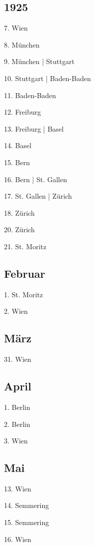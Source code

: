 \documentclass[twoside=false,titlepage=false,open=any, parskip=never, fontsize=10pt, headings=small, chapterprefix=false, appendixprefix=false, DIV=15]{scrbook}
\begin{document}
\begin{multicols}{3}
            \chapter*{1925}
            7. Wien\par
            8. München\par
            9. München | Stuttgart\par
            10. Stuttgart | Baden-Baden\par
            11. Baden-Baden\par
            12. Freiburg\par
            13. Freiburg | Basel\par
            14. Basel\par
            15. Bern\par
            16. Bern | St. Gallen\par
            17. St. Gallen | Zürich\par
            18. Zürich\par
            20. Zürich\par
            21. St. Moritz\par
            \section*{Februar}
            1. St. Moritz\par
            2. Wien\par
            \section*{März}
            31. Wien\par
            \section*{April}
            1. Berlin\par
            2. Berlin\par
            3. Wien\par
            \section*{Mai}
            13. Wien\par
            14. Semmering\par
            15. Semmering\par
            16. Wien\par

\end{multicols}
\end{document}
